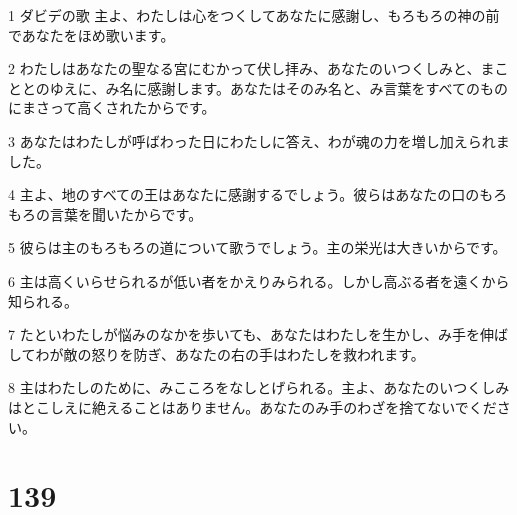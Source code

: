 \par 1 ダビデの歌 主よ、わたしは心をつくしてあなたに感謝し、もろもろの神の前であなたをほめ歌います。
\par 2 わたしはあなたの聖なる宮にむかって伏し拝み、あなたのいつくしみと、まこととのゆえに、み名に感謝します。あなたはそのみ名と、み言葉をすべてのものにまさって高くされたからです。
\par 3 あなたはわたしが呼ばわった日にわたしに答え、わが魂の力を増し加えられました。
\par 4 主よ、地のすべての王はあなたに感謝するでしょう。彼らはあなたの口のもろもろの言葉を聞いたからです。
\par 5 彼らは主のもろもろの道について歌うでしょう。主の栄光は大きいからです。
\par 6 主は高くいらせられるが低い者をかえりみられる。しかし高ぶる者を遠くから知られる。
\par 7 たといわたしが悩みのなかを歩いても、あなたはわたしを生かし、み手を伸ばしてわが敵の怒りを防ぎ、あなたの右の手はわたしを救われます。
\par 8 主はわたしのために、みこころをなしとげられる。主よ、あなたのいつくしみはとこしえに絶えることはありません。あなたのみ手のわざを捨てないでください。

\chapter{139}

